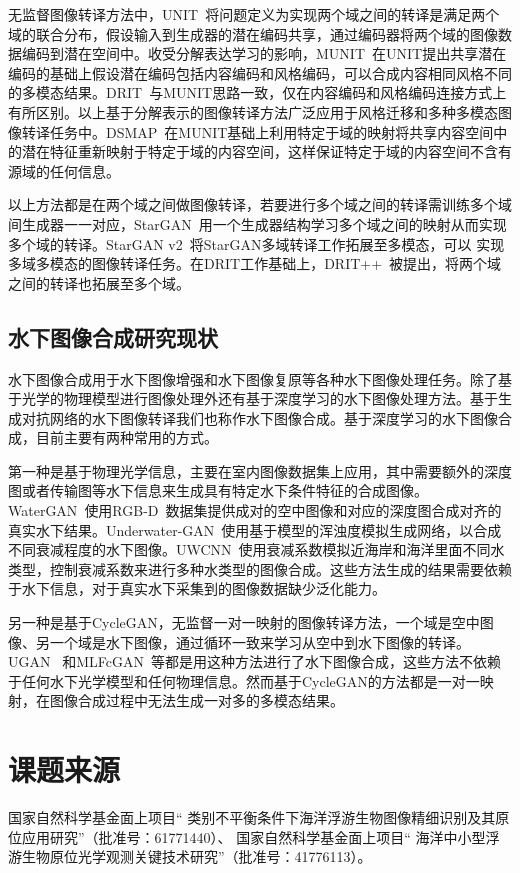 无监督图像转译方法中，UNIT~\cite{liu2017unsupervised}将问题定义为实现两个域之间的转译是满足两个域的联合分布，假设输入到生成器的潜在编码共享，通过编码器将两个域的图像数据编码到潜在空间中。收受分解表达学习的影响，MUNIT~\cite{huang2018multimodal}在UNIT提出共享潜在编码的基础上假设潜在编码包括内容编码和风格编码，可以合成内容相同风格不同的多模态结果。DRIT~\cite{lee2018diverse}与MUNIT思路一致，仅在内容编码和风格编码连接方式上有所区别。以上基于分解表示的图像转译方法广泛应用于风格迁移和多种多模态图像转译任务中。DSMAP~\cite{chang2020domain}在MUNIT基础上利用特定于域的映射将共享内容空间中的潜在特征重新映射于特定于域的内容空间，这样保证特定于域的内容空间不含有源域的任何信息。

以上方法都是在两个域之间做图像转译，若要进行多个域之间的转译需训练多个域间生成器一一对应，StarGAN~\cite{choi2018stargan}用一个生成器结构学习多个域之间的映射从而实现多个域的转译。StarGAN v2~\cite{choi2020stargan}将StarGAN多域转译工作拓展至多模态，可以 实现多域多模态的图像转译任务。在DRIT工作基础上，DRIT++~\cite{lee2020drit++}被提出，将两个域之间的转译也拓展至多个域。


\subsection{水下图像合成研究现状} 
水下图像合成用于水下图像增强和水下图像复原等各种水下图像处理任务。除了基于光学的物理模型进行图像处理外还有基于深度学习的水下图像处理方法。基于生成对抗网络的水下图像转译我们也称作水下图像合成。基于深度学习的水下图像合成，目前主要有两种常用的方式。

第一种是基于物理光学信息，主要在室内图像数据集上应用，其中需要额外的深度图或者传输图等水下信息来生成具有特定水下条件特征的合成图像。WaterGAN~\cite{li2017watergan}使用RGB-D~\cite{}数据集提供成对的空中图像和对应的深度图合成对齐的真实水下结果。Underwater-GAN~\cite{yu2018underwater}使用基于模型的浑浊度模拟生成网络，以合成不同衰减程度的水下图像。UWCNN~\cite{li2020underwater}使用衰减系数模拟近海岸和海洋里面不同水类型，控制衰减系数来进行多种水类型的图像合成。这些方法生成的结果需要依赖于水下信息，对于真实水下采集到的图像数据缺少泛化能力。

另一种是基于CycleGAN，无监督一对一映射的图像转译方法，一个域是空中图像、另一个域是水下图像，通过循环一致来学习从空中到水下图像的转译。UGAN~
\cite{fabbri2018enhancing}和MLFcGAN~\cite{liu2019mlfcgan}等都是用这种方法进行了水下图像合成，这些方法不依赖于任何水下光学模型和任何物理信息。然而基于CycleGAN的方法都是一对一映射，在图像合成过程中无法生成一对多的多模态结果。


\section{课题来源}
国家自然科学基金面上项目“ 类别不平衡条件下海洋浮游生物图像精细识别及其原位应用研究”（批准号：61771440）、   国家自然科学基金面上项目“ 海洋中小型浮游生物原位光学观测关键技术研究”（批准号：41776113）。


